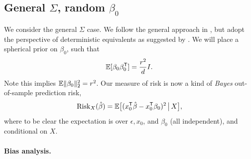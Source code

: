 \documentclass{article}
\begin{document}
\subsection{General $\Sigma$, random $\beta_0$}

We consider the general $\Sigma$ case. We follow the general approach in
\citet{dobriban2018high}, but adopt the perspective of deterministic equivalents
as suggested by \citet{dobriban2021distributed}. We will place a spherical prior on $\beta_0$,
such that       
\begin{equation}
\label{eq:prior}
\mathbb{E}[\beta_0 \beta_0^{\mathsf{T}}] = \frac{r^2}{d} I.
\end{equation}
Note this implies $\mathbb{E} \|\beta_0\|_2^2 = r^2$. Our measure of risk is now a kind
of \emph{Bayes} out-of-sample prediction risk,  
\begin{equation}
\label{eq:ridge_risk_bayes}
\mathrm{Risk}_X(\hat{\beta}) = \mathbb{E} \big[ ( x_0^{\mathsf{T}} \hat{\beta} - x_0^{\mathsf{T}} \beta_0 )^2 \,\big|\,
X \big],
\end{equation}
where to be clear the expectation is over $\epsilon, x_0$, and $\beta_0$ (all
independent), and conditional on $X$. 

\paragraph{Bias analysis.}
\end{document}
